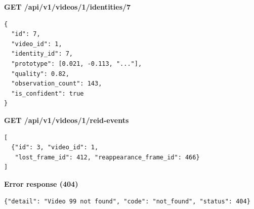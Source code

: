 \textbf{GET /api/v1/videos/1/identities/7}
\begin{lstlisting}[style=added]
{
  "id": 7,
  "video_id": 1,
  "identity_id": 7,
  "prototype": [0.021, -0.113, "..."],
  "quality": 0.82,
  "observation_count": 143,
  "is_confident": true
}
\end{lstlisting}

\textbf{GET /api/v1/videos/1/reid-events}
\begin{lstlisting}[style=added]
[
  {"id": 3, "video_id": 1,
   "lost_frame_id": 412, "reappearance_frame_id": 466}
]
\end{lstlisting}

\textbf{Error response (404)}
\begin{lstlisting}[style=added]
{"detail": "Video 99 not found", "code": "not_found", "status": 404}
\end{lstlisting}
